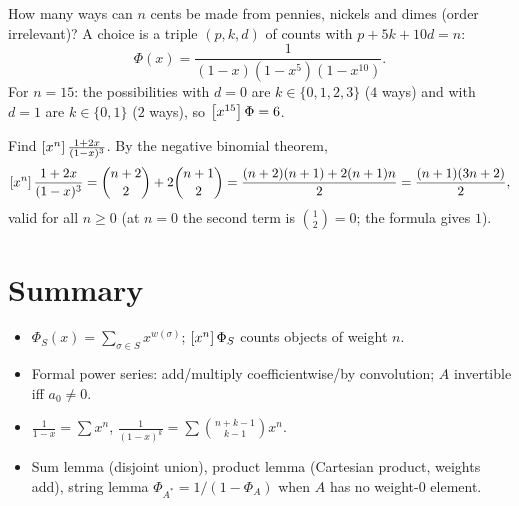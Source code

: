 \begin{example}
How many ways can $n$ cents be made from pennies, nickels and dimes (order irrelevant)?
A choice is a triple $(p, k, d)$ of counts with $p + 5k + 10d = n$:
\[
\Phi(x) = \frac{1}{(1-x)(1-x^5)(1-x^{10})}.
\]
For $n = 15$: the possibilities with $d = 0$ are $k \in\{0,1,2,3\}$ ($4$ ways) and with $d = 1$
are $k \in \{0,1\}$ ($2$ ways), so $\left[x^{15}\right]\Phi = 6$.
\end{example}

\begin{example}
Find $\left[x^{n}\right] \frac{1 + 2x}{(1-x)^3}$. By the negative binomial theorem,
\[
\left[x^{n}\right]\frac{1+2x}{(1-x)^3} = \binom{n+2}{2} + 2\binom{n+1}{2}
= \frac{(n+2)(n+1) + 2(n+1)n}{2} = \frac{(n+1)(3n+2)}{2},
\]
valid for all $n \ge 0$ (at $n = 0$ the second term is $\binom{1}{2} = 0$; the formula gives $1$).
\end{example}

\section{Summary}
\begin{itemize}
  \item $\Phi_S(x) = \sum_{\sigma\in S} x^{w(\sigma)}$; $\left[x^{n}\right]\Phi_S$ counts objects of weight $n$.
  \item Formal power series: add/multiply coefficientwise/by convolution; $A$ invertible iff $a_0\ne0$.
  \item $\frac{1}{1-x} = \sum x^n$, $\frac{1}{(1-x)^k} = \sum \binom{n+k-1}{k-1}x^n$.
  \item Sum lemma (disjoint union), product lemma (Cartesian product, weights add), string lemma
        $\Phi_{A^*} = 1/(1-\Phi_A)$ when $A$ has no weight-$0$ element.
\end{itemize}
